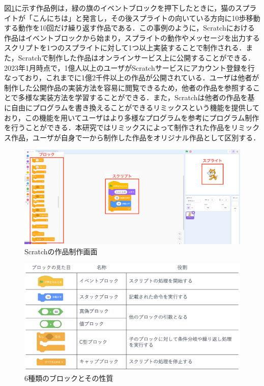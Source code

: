 \documentclass[11pt,dvipdfmx]{jreport}
\begin{document}
図\ref{fig:scratch-description}に示す作品例は，緑の旗のイベントブロックを押下したときに，猫のスプライトが「こんにちは」と発言し，その後スプライトの向いている方向に10歩移動する動作を10回だけ繰り返す作品である．この事例のように，Scratchにおける作品はイベントブロックから始まり，スプライトの動作やメッセージを出力するスクリプトを1つのスプライトに対して1つ以上実装することで制作される．また，Scratchで制作した作品はオンラインサービス上に公開することができる．2023年1月時点で，1億人以上のユーザがScratchサービスにアカウント登録を行なっており，これまでに1億2千件以上の作品が公開されている．ユーザは他者が制作した公開作品の実装方法を容易に閲覧できるため，他者の作品を参照することで多様な実装方法を学習することができる．\cite{spfa}また，Scratchは他者の作品を基に自由にプログラムを書き換えることができるリミックスという機能を提供しており，この機能を用いてユーザはより多様なプログラムを参考にプログラム制作を行うことができる．本研究ではリミックスによって制作された作品をリミックス作品，ユーザが自身で一から制作した作品をオリジナル作品として区別する．


\begin{figure}[t]
	\centering
	\includegraphics[width=0.9\linewidth]{Okamoto_fig/scratch-description.pdf}
	\caption{Scratchの作品制作画面}
	\label{fig:scratch-description}
\end{figure}

\begin{figure}[t]
	\centering
	\includegraphics[width=0.9\linewidth]{Okamoto_fig/blocks.pdf}
	\caption{6種類のブロックとその性質}
	\label{fig:blocks}
\end{figure}
\end{document}
